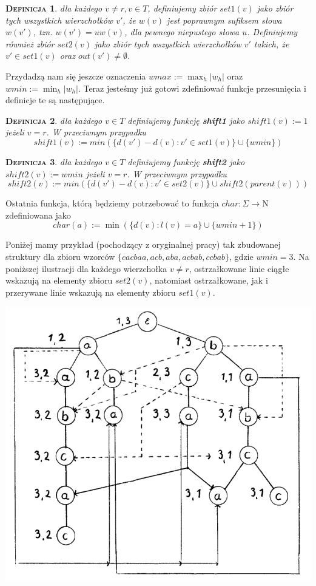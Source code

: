 \documentclass[a4paper,11pt]{article}
\newtheorem{DEF}{\textsc{Definicja}}[section]
\begin{document}
\begin{DEF}
dla każdego $v \not = r, v \in T$, definiujemy
zbiór $set1(v)$ jako zbiór tych wszystkich wierzchołków $v'$, że $w(v)$ jest poprawnym sufiksem słowa $w(v')$, tzn. $w(v') = uw(v)$, dla pewnego niepustego słowa $u$. Definiujemy również zbiór $set2(v)$ jako zbiór tych wszystkich wierzchołków $v'$ takich, że $v' \in set1(v)$ oraz $out(v') \not = \emptyset$. 
\end{DEF}

\noindent Przydadzą nam się jeszcze oznaczenia $wmax := \max_{h}|w_h|$ oraz $wmin := \min_{h}|w_h|$. Teraz jesteśmy już gotowi zdefiniować funkcje przesunięcia i definicje te są następujące.

\begin{DEF}
dla każdego $v \in T$ definiujemy funkcję \textbf{shift1} jako $shift1(v) := 1$ jeżeli $v=r$. W przeciwnym przypadku $$shift1(v) :=  min \left( \{d(v')-d(v) : v' \in set1(v) \} \cup \{wmin\}\right)$$
\end{DEF}

\begin{DEF}
dla każdego $v \in T$ definiujemy funkcję \textbf{shift2} jako $shift2(v) := wmin$ jeżeli $v=r$. W przeciwnym przypadku $$shift2(v) :=  min \left( \{d(v')-d(v) : v' \in set2(v) \} \cup shift2(parent(v))\right)$$
\end{DEF}

\noindent Ostatnia funkcja, którą będziemy potrzebować to funkcja $char: \Sigma \longrightarrow \mathrm{N}$ zdefiniowana jako $$char(a) := \min (\{ d(v) : l(v) = a \} \cup \{ wmin+1 \})$$

\noindent Poniżej mamy przykład (pochodzący z oryginalnej pracy) tak zbudowanej struktury dla zbioru wzorców $\{cacbaa, acb, aba, acbab, ccbab\}$, gdzie $wmin = 3$. Na poniższej ilustracji dla każdego wierzchołka $v \not = r$, ostrzałkowane linie ciągłe wskazują na elementy zbioru $set2(v)$, natomiast ostrzałkowane, jak i przerywane linie wskazują na elementy zbioru $set1(v)$.

\begin{center}
\includegraphics[scale=0.4]{trie.png}
\end{center}
\end{document}
